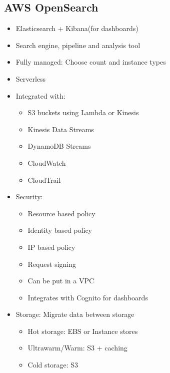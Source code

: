 \documentclass[../../main.tex]{subfiles}
\begin{document}
\subsection{AWS OpenSearch}
\begin{itemize}
    \item Elasticsearch + Kibana(for dashboards)
    \item Search engine, pipeline and analysis tool
    \item Fully managed: Choose count and instance types
    \item Serverless
    \item Integrated with:
    \begin{itemize}
        \item S3 buckets using Lambda or Kinesis
        \item Kinesis Data Streams
        \item DynamoDB Streams
        \item CloudWatch
        \item CloudTrail
    \end{itemize}
    \item Security:
    \begin{itemize}
        \item Resource based policy
        \item Identity based policy
        \item IP based policy
        \item Request signing
        \item Can be put in a VPC
        \item Integrates with Cognito for dashboards
    \end{itemize}
    \item Storage: Migrate data between storage
    \begin{itemize}
        \item Hot storage: EBS or Instance stores
        \item Ultrawarm/Warm: S3 + caching
        \item Cold storage: S3
    \end{itemize}
\end{itemize}
\end{document}
